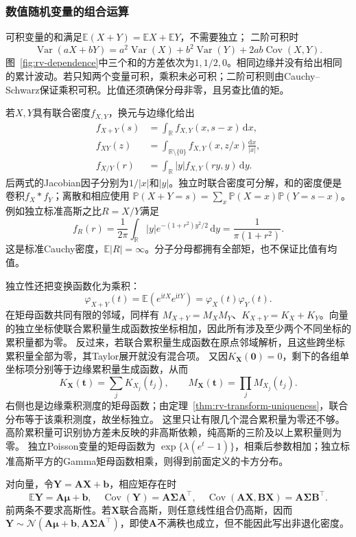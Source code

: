 \subsubsection{数值随机变量的组合运算}
\label{sec:rv-combinations}
可积变量的和满足\(\mathbb E(X+Y)=\mathbb EX+\mathbb EY\)，不需要独立；
二阶可积时
\[
\operatorname{Var}(aX+bY)
=a^2\operatorname{Var}(X)+b^2\operatorname{Var}(Y)
 +2ab\operatorname{Cov}(X,Y).
\]
图~\ref{fig:rv-dependence}中三个和的方差依次为\(1,1/2,0\)。相同边缘并没有给出相同的累计波动。若只知两个变量可积，乘积未必可积；二阶可积则由Cauchy--Schwarz保证乘积可积。比值还须确保分母非零，且另查比值的矩。

若\(X,Y\)具有联合密度\(f_{X,Y}\)，换元与边缘化给出
\[
\begin{aligned}
f_{X+Y}(s)&=\int_{\mathbb R}f_{X,Y}(x,s-x)\,\mathrm dx,\\
f_{XY}(z)&=\int_{\mathbb R\setminus\{0\}}
 f_{X,Y}(x,z/x)\frac{\mathrm dx}{|x|},\\
f_{X/Y}(r)&=\int_{\mathbb R}|y|f_{X,Y}(ry,y)\,\mathrm dy.
\end{aligned}
\]
后两式的Jacobian因子分别为\(1/|x|\)和\(|y|\)。独立时联合密度可分解，和的密度便是卷积\(f_X*f_Y\)；离散和相应使用
\(\mathbb P(X+Y=s)=\sum_x\mathbb P(X=x)\mathbb P(Y=s-x)\)。
例如独立标准高斯之比\(R=X/Y\)满足
\[
f_R(r)=\frac1{2\pi}\int_{\mathbb R}|y|
 e^{-(1+r^2)y^2/2}\,\mathrm dy
=\frac1{\pi(1+r^2)}.
\]
这是标准Cauchy密度，\(\mathbb E|R|=\infty\)。分子分母都拥有全部矩，也不保证比值有均值。

独立性还把变换函数化为乘积：
\[
\varphi_{X+Y}(t)=\mathbb E(e^{\mathrm itX}e^{\mathrm itY})
=\varphi_X(t)\varphi_Y(t).
\]
在矩母函数共同有限的邻域，同样有
\(M_{X+Y}=M_XM_Y\)、\(K_{X+Y}=K_X+K_Y\)。向量的独立坐标使联合累积量生成函数按坐标相加，因此所有涉及至少两个不同坐标的累积量都为零。
反过来，若联合累积量生成函数在原点邻域解析，且这些跨坐标累积量全部为零，其Taylor展开就没有混合项。
又因\(K_{\bm X}(\bm0)=0\)，剩下的各组单坐标项分别等于边缘累积量生成函数，从而
\[
 K_{\bm X}(\bm t)=\sum_jK_{X_j}(t_j),\qquad
 M_{\bm X}(\bm t)=\prod_jM_{X_j}(t_j).
\]
右侧也是边缘乘积测度的矩母函数；由定理~\ref{thm:rv-transform-uniqueness}，联合分布等于该乘积测度，故坐标独立。
这里只让有限几个混合累积量为零还不够。高阶累积量可识别协方差未反映的非高斯依赖，纯高斯的三阶及以上累积量则为零。
独立Poisson变量的矩母函数为
\(\exp\{\lambda(e^t-1)\}\)，相乘后参数相加；独立标准高斯平方的Gamma矩母函数相乘，则得到前面定义的卡方分布。

对向量，令\(\bm Y=\bm A\bm X+\bm b\)，相应矩存在时
\[
\mathbb E\bm Y=\bm A\bm\mu+\bm b,\quad
\operatorname{Cov}(\bm Y)=\bm A\bm\Sigma\bm A^\top,\quad
\operatorname{Cov}(\bm A\bm X,\bm B\bm X)=\bm A\bm\Sigma\bm B^\top.
\]
前两条不要求高斯性。若\(\bm X\)联合高斯，则任意线性组合仍高斯，因而
\(\bm Y\sim\mathcal N(\bm A\bm\mu+\bm b,\bm A\bm\Sigma\bm A^\top)\)，即使\(\bm A\)不满秩也成立，但不能因此写出非退化密度。

